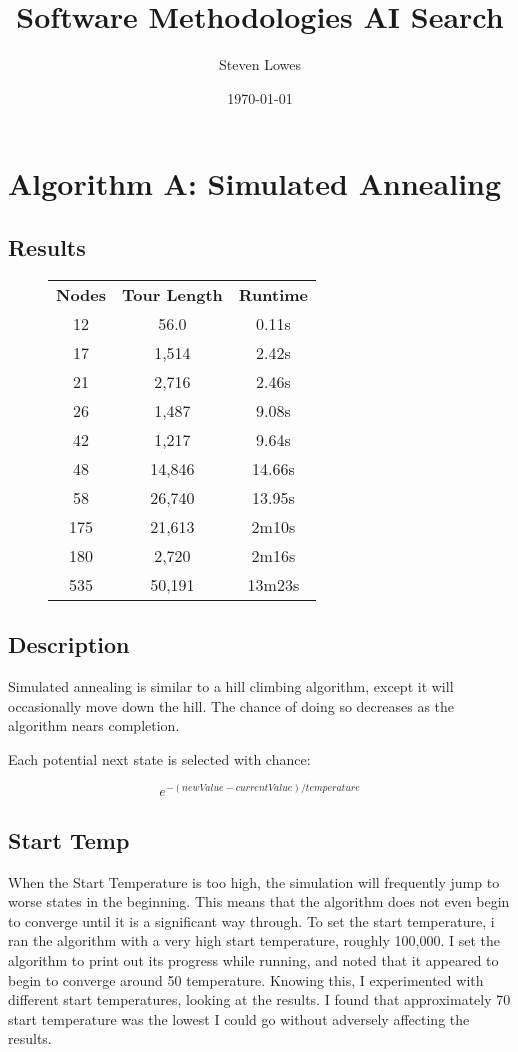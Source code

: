 \documentclass[a4paper, 11pt,table]{article}
\author{Steven Lowes}
\title{Software Methodologies AI Search}
\date{\today{}}
\begin{document}
	
	\section{Algorithm A: Simulated Annealing}
	
	\subsection{Results}
	\begin{figure}
	\label{useCase:annealResults}
	\begin{center}
		\begin{tabu}{|c c c|}
			\textbf{Nodes} & \textbf{Tour Length} & \textbf{Runtime} \\
			12 & 56.0 & 0.11s \\
			17 & 1,514 & 2.42s \\
			21 & 2,716 & 2.46s \\
			26 & 1,487 & 9.08s \\
			42 & 1,217 & 9.64s \\
			48 & 14,846 & 14.66s \\
			58 & 26,740 & 13.95s \\
			175 & 21,613 & 2m10s \\
			180 & 2,720 & 2m16s \\
			535 & 50,191 & 13m23s \\
		\end{tabu}
	\end{center}
\end{figure}
	
	\subsection{Description}
	Simulated annealing is similar to a hill climbing algorithm, except it will occasionally move down the hill. The chance of doing so decreases as the algorithm nears completion.
	
	Each potential next state is selected with chance:
	
	\begin{equation}
		e^{-(newValue - currentValue) / temperature}
	\end{equation}
	
	\subsection{Start Temp}
	When the Start Temperature is too high, the simulation will frequently jump to worse states in the beginning. This means that the algorithm does not even begin to converge until it is a significant way through. To set the start temperature, i ran the algorithm with a very high start temperature, roughly 100,000. I set the algorithm to print out its progress while running, and noted that it appeared to begin to converge around 50 temperature. Knowing this, I experimented with different start temperatures, looking at the results. I found that approximately 70 start temperature was the lowest I could go without adversely affecting the results.
	
\end{document}
